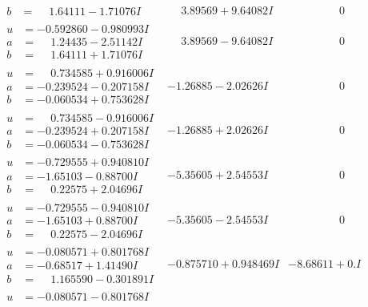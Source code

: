 \documentclass[1p]{elsarticle_modified}
\theoremstyle{definition}
\begin{document}
$$\begin{array}{c|c|c}
\begin{aligned}
b &= \phantom{-}1.64111 - 1.71076 I\end{aligned}
 & \phantom{-}3.89569 + 9.64082 I & \phantom{-0.000000 } 0 \\ \hline\begin{aligned}
u &= -0.592860 - 0.980993 I \\
a &= \phantom{-}1.24435 - 2.51142 I \\
b &= \phantom{-}1.64111 + 1.71076 I\end{aligned}
 & \phantom{-}3.89569 - 9.64082 I & \phantom{-0.000000 } 0 \\ \hline\begin{aligned}
u &= \phantom{-}0.734585 + 0.916006 I \\
a &= -0.239524 - 0.207158 I \\
b &= -0.060534 + 0.753628 I\end{aligned}
 & -1.26885 - 2.02626 I & \phantom{-0.000000 } 0 \\ \hline\begin{aligned}
u &= \phantom{-}0.734585 - 0.916006 I \\
a &= -0.239524 + 0.207158 I \\
b &= -0.060534 - 0.753628 I\end{aligned}
 & -1.26885 + 2.02626 I & \phantom{-0.000000 } 0 \\ \hline\begin{aligned}
u &= -0.729555 + 0.940810 I \\
a &= -1.65103 - 0.88700 I \\
b &= \phantom{-}0.22575 + 2.04696 I\end{aligned}
 & -5.35605 + 2.54553 I & \phantom{-0.000000 } 0 \\ \hline\begin{aligned}
u &= -0.729555 - 0.940810 I \\
a &= -1.65103 + 0.88700 I \\
b &= \phantom{-}0.22575 - 2.04696 I\end{aligned}
 & -5.35605 - 2.54553 I & \phantom{-0.000000 } 0 \\ \hline\begin{aligned}
u &= -0.080571 + 0.801768 I \\
a &= -0.68517 + 1.41490 I \\
b &= \phantom{-}1.165590 - 0.301891 I\end{aligned}
 & -0.875710 + 0.948469 I & -8.68611 + 0. I\phantom{ +0.000000I} \\ \hline\begin{aligned}
u &= -0.080571 - 0.801768 I \\

\end{aligned}
\end{array}$$
\end{document}

